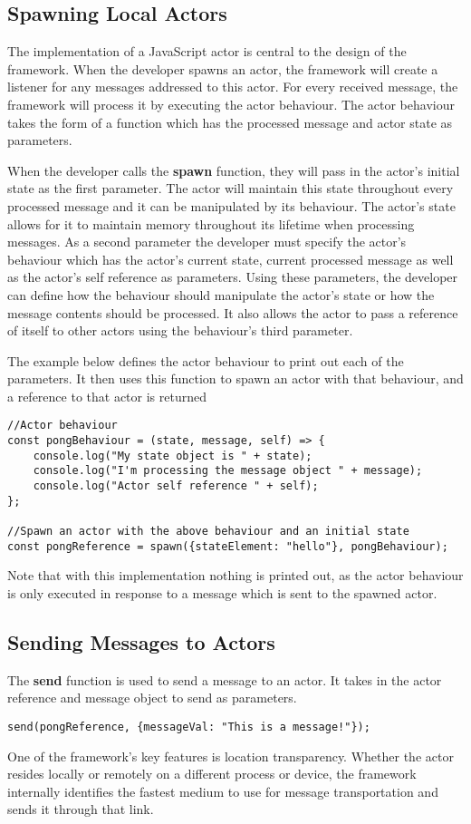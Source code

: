 \documentclass[12pt, a4paper]{report}
\theoremstyle{definition}
\theoremstyle{definition}%
\theoremstyle{definition}%
\theoremstyle{definition}%
\theoremstyle{definition}%
\theoremstyle{definition}%
\begin{document}
\subsection{Spawning Local Actors}
The implementation of a JavaScript actor is central to the design of the framework. When the developer spawns an actor, the framework will create a listener for any messages addressed to this actor. For every received message, the framework will process it by executing the actor behaviour. The actor behaviour takes the form of a function which has the processed message and actor state as parameters.

When the developer calls the \textbf{spawn} function, they will pass in the actor's initial state as the first parameter. The actor will maintain this state throughout every processed message and it can be manipulated by its behaviour. The actor's state allows for it to maintain memory throughout its lifetime when processing messages. As a second parameter the developer must specify the actor's behaviour which has the actor's current state, current processed message as well as the actor's self reference as parameters. Using these parameters, the developer can define how the behaviour should manipulate the actor's state or how the message contents should be processed. It also allows the actor to pass a reference of itself to other actors using the behaviour's third parameter.

The example below defines the actor behaviour to print out each of the parameters. It then uses this function to spawn an actor with that behaviour, and a reference to that actor is returned
\begin{lstlisting}
//Actor behaviour
const pongBehaviour = (state, message, self) => {
    console.log("My state object is " + state);
    console.log("I'm processing the message object " + message);
    console.log("Actor self reference " + self);
};

//Spawn an actor with the above behaviour and an initial state
const pongReference = spawn({stateElement: "hello"}, pongBehaviour);
\end{lstlisting}
Note that with this implementation nothing is printed out, as the actor behaviour is only executed in response to a message which is sent to the spawned actor.
\subsection{Sending Messages to Actors}
The \textbf{send} function is used to send a message to an actor. It takes in the actor reference and message object to send as parameters.
\begin{lstlisting}
send(pongReference, {messageVal: "This is a message!"});
\end{lstlisting}
One of the framework's key features is location transparency. Whether the actor resides locally or remotely on a different process or device, the framework internally identifies the fastest medium to use for message transportation and sends it through that link.
\end{document}
